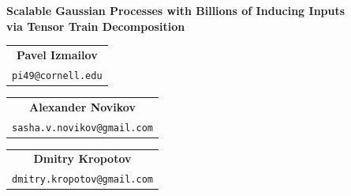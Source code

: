 \documentclass[a0,portrait]{a0poster}
\begin{document}
\begin{minipage}[b]{.85\linewidth}
  \begin{center}
  \Huge \color{NavyBlue} 
    \textbf{Scalable Gaussian Processes with Billions of Inducing Inputs \\via Tensor Train Decomposition} \color{Black}\\ %
    {
      \huge 
      \renewcommand{\arraystretch}{0.5}
      \begin{tabular}{c}
        \textbf{Pavel Izmailov}\\
        {\Large \texttt{pi49@cornell.edu}}
      \end{tabular}\quad 
      \begin{tabular}{c}
        \textbf{Alexander Novikov}\\
        {\Large \texttt{sasha.v.novikov@gmail.com}}
      \end{tabular}
      \quad 
      \begin{tabular}{c}
        \textbf{Dmitry Kropotov}\\
        {\Large \texttt{dmitry.kropotov@gmail.com}}
      \end{tabular}
    }
\end{center}
\end{minipage}
\end{document}
